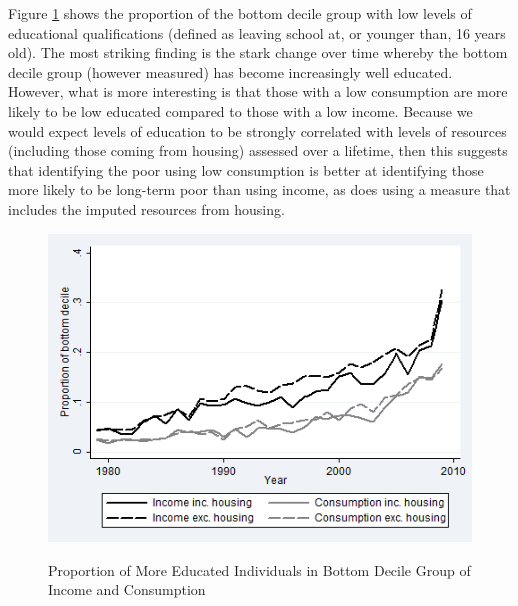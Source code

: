 Figure \ref{fig:pov_comp} shows the proportion of the bottom decile group with low levels of educational qualifications (defined as leaving school at, or younger than, 16 years old). The most striking finding is the stark change over time whereby the bottom decile group (however measured) has become increasingly well educated. However, what is more interesting is that those with a low consumption are more likely to be low educated compared to those with a low income. Because we would expect levels of education to be strongly correlated with levels of resources (including those coming from housing) assessed over a lifetime, then this suggests that identifying the poor using low consumption is better at identifying those more likely to be long-term poor than using income, as does using a measure that includes the imputed resources from housing.

\begin{figure}
\caption{Proportion of More Educated Individuals in Bottom Decile Group of Income and Consumption}
\centering
\includegraphics[width=.7\linewidth]{pictures/dec_comp4.png}
\label{fig:pov_comp}
\end{figure}

